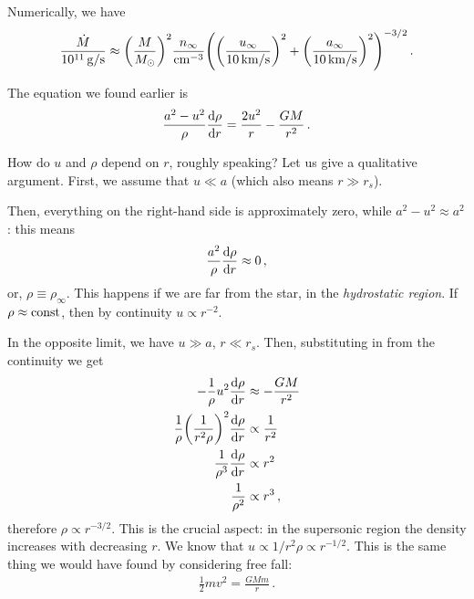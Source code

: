 \documentclass[main.tex]{subfiles}
\begin{document}
Numerically, we have 
%
\begin{align}
\frac{\dot{M}}{\SI{e11}{g/s}} \approx \qty(\frac{M}{M_{\odot}})^2 \frac{n_\infty}{\SI{}{cm^{-3}}} \qty( \qty( \frac{u_{\infty}}{\SI{10}{km/s}} ) ^2 + \qty( \frac{a_{\infty}}{\SI{10}{km/s}} ) ^2 )^{-3/2} 
\,.
\end{align}
%

The equation  we found earlier is 
%
\begin{align}
\frac{a^2- u^2}{\rho } \dv{\rho }{r} = \frac{2u^2}{r} - \frac{GM}{r^2}
\,.
\end{align}

How do \(u\) and \(\rho \) depend on \(r\), roughly speaking? 
Let us give a qualitative argument. First, we assume that \(u \ll a\) (which also means \(r \gg r_s\)).

Then, everything on the right-hand side is approximately zero, while \(a^2-  u^2 \approx a^2\): this means 
%
\begin{align}
\frac{a^2}{\rho } \dv{\rho }{r} \approx 0
\,,
\end{align}
%
or, \(\rho \equiv \rho _\infty \). This happens if we are far from the star, in the \emph{hydrostatic region}. 
If \(\rho \approx \text{const}\), then by continuity \(u \propto r^{-2}\).


In the opposite limit, we have \(u \gg a\), \(r \ll r_s\).
Then, substituting in from the continuity we get
%
\begin{align}
- \frac{1}{\rho } u^2 \dv{\rho }{r} &\approx - \frac{GM}{r^2}  \\
\frac{1}{\rho } \qty( \frac{1}{r^2 \rho })^2 \dv{\rho }{r} &\propto \frac{1}{r^2}  \\
\frac{1}{\rho^3 }\dv{\rho }{r} &\propto r^2  \\
\frac{1}{\rho^2} &\propto r^3
\,,
\end{align}
%
therefore \(\rho \propto r^{-3/2}\). This is the crucial aspect: in the supersonic region the density increases with decreasing \(r\). 
We know that \(u \propto 1/ r^2 \rho \propto r^{-1/2}\).  
This is the same thing we would have found by considering free fall: 
%
\begin{align}
\frac{1}{2} m v^2 = \frac{GMm}{r}
\,.
\end{align}
\end{document}

